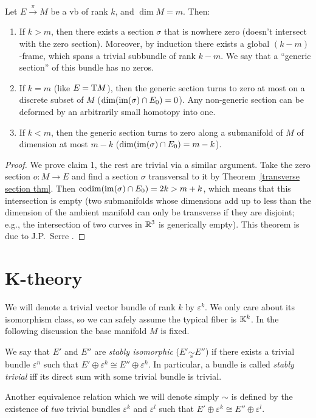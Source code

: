 \begin{cor}
Let $E\overset{\pi}{\to} M$ be a \gls{vb} of rank $k$, and $\dim M=m$. Then:
\begin{enumerate}
    \item If $k>m$, then there exists a section $\sigma$ that is nowhere zero (doesn't intersect with the zero section). Moreover, by induction there exists a global $(k-m)$-frame, which spans a trivial subbundle of rank $k-m$. We say that a ``generic section'' of this bundle has no zeros.
    \item If $k=m$ (like $E=\mathrm{T} M$), then the generic section turns to zero at most on a discrete subset of $M$ ($\dim(\operatorname{im}(\sigma)\cap E_0)=0$). Any non-generic section can be deformed by an arbitrarily small homotopy into one.
    \item If $k<m$, then the generic section turns to zero along a submanifold of $M$ of dimension at most $m-k$ ($\dim(\operatorname{im}(\sigma)\cap E_0)=m-k$). 
\end{enumerate}
\end{cor}
\begin{proof}
    We prove claim 1, the rest are trivial via a similar argument. Take the zero section $o:M\to E$ and find a   section $\sigma$ transversal to it by Theorem~\ref{transverse section thm}. Then $\operatorname{codim}(\operatorname{im} (\sigma)\cap E_0)=2k>m+k$, which means that this intersection is empty (two submanifolds whose dimensions add up to less than the dimension of the ambient manifold can only be transverse if they are disjoint; e.g., the intersection of two curves in $\mathbb{R}^3$ is generically empty). This theorem is due to J.P.~Serre \cite[Thm.~2]{Atiyah}.
\end{proof}






\section{K-theory}

We will denote a trivial vector bundle of rank $k$ by $\varepsilon^k$. We only care about its isomorphism class, so we can safely assume the typical fiber is $\mathbb{K}^k$. In the following discussion the base manifold $M$ is fixed.

\begin{defn}
We say that $E'$ and $E''$ are \emph{stably isomorphic} ($E'\underset{\mathrm{s}}{\sim}E''$) if there exists a trivial bundle $\varepsilon^n$ such that $E'\oplus \varepsilon^k \cong E''\oplus\varepsilon^k$. In particular, a bundle is called \emph{stably trivial} iff its direct sum with some trivial bundle is trivial.

Another equivalence relation which we will denote simply $\sim$ is defined by the existence of \emph{two} trivial bundles $\varepsilon^k$ and $\varepsilon^l$ such that $E'\oplus \varepsilon^k\cong E''\oplus \varepsilon^l$.
\end{defn}


